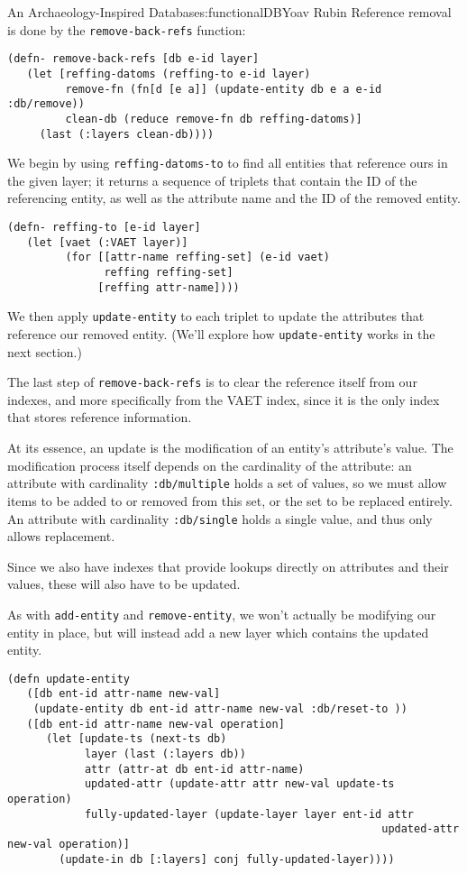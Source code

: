 \begin{aosachapter}{An Archaeology-Inspired Database}{s:functionalDB}{Yoav Rubin}
Reference removal is done by the \texttt{remove-back-refs} function:

\begin{verbatim}
(defn- remove-back-refs [db e-id layer]
   (let [reffing-datoms (reffing-to e-id layer)
         remove-fn (fn[d [e a]] (update-entity db e a e-id :db/remove))
         clean-db (reduce remove-fn db reffing-datoms)]
     (last (:layers clean-db))))
\end{verbatim}

We begin by using \texttt{reffing-datoms-to} to find all entities that
reference ours in the given layer; it returns a sequence of triplets
that contain the ID of the referencing entity, as well as the attribute
name and the ID of the removed entity.

\begin{verbatim}
(defn- reffing-to [e-id layer]
   (let [vaet (:VAET layer)]
         (for [[attr-name reffing-set] (e-id vaet)
               reffing reffing-set]
              [reffing attr-name])))
\end{verbatim}

We then apply \texttt{update-entity} to each triplet to update the
attributes that reference our removed entity. (We'll explore how
\texttt{update-entity} works in the next section.)

The last step of \texttt{remove-back-refs} is to clear the reference
itself from our indexes, and more specifically from the VAET index,
since it is the only index that stores reference information.

\label{updating-an-entity}

At its essence, an update is the modification of an entity's attribute's
value. The modification process itself depends on the cardinality of the
attribute: an attribute with cardinality \texttt{:db/multiple} holds a
set of values, so we must allow items to be added to or removed from
this set, or the set to be replaced entirely. An attribute with
cardinality \texttt{:db/single} holds a single value, and thus only
allows replacement.

Since we also have indexes that provide lookups directly on attributes
and their values, these will also have to be updated.

As with \texttt{add-entity} and \texttt{remove-entity}, we won't
actually be modifying our entity in place, but will instead add a new
layer which contains the updated entity.

\begin{verbatim}
(defn update-entity
   ([db ent-id attr-name new-val]
    (update-entity db ent-id attr-name new-val :db/reset-to ))
   ([db ent-id attr-name new-val operation]
      (let [update-ts (next-ts db)
            layer (last (:layers db))
            attr (attr-at db ent-id attr-name)
            updated-attr (update-attr attr new-val update-ts operation)
            fully-updated-layer (update-layer layer ent-id attr 
                                                          updated-attr new-val operation)]
        (update-in db [:layers] conj fully-updated-layer))))
\end{verbatim}


\end{aosachapter}
